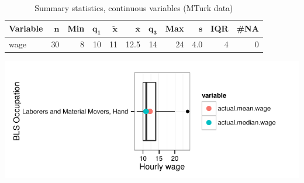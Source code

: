 \documentclass[a4paper,10pt]{article}\usepackage[]{graphicx}\usepackage[]{color}
\makeatletter
\def\maxwidth{ %
  \ifdim\Gin@nat@width>\linewidth
    \linewidth
  \else
    \Gin@nat@width
  \fi
}
\makeatother
\begin{document}
\begin{table}[ht]
\centering
{\footnotesize
\begin{tabular}{lrrrrrrrrrr}
 \textbf{Variable} & $\mathbf{n}$ & \textbf{Min} & $\mathbf{q_1}$ & $\mathbf{\widetilde{x}}$ & $\mathbf{\bar{x}}$ & $\mathbf{q_3}$ & \textbf{Max} & $\mathbf{s}$ & \textbf{IQR} & \textbf{\#NA} \\ 
  \hline
wage & 30 & 8 & 10 & 11 & 12.5 & 14 & 24 & 4.0 & 4 & 0 \\ 
  \end{tabular}
}
\caption{Summary statistics, continuous variables (MTurk data)} 
\label{tab2:53-7060}
\end{table}


{\centering \includegraphics[width=\maxwidth]{figure/unnamed-chunk-25} 

}
\end{document}
